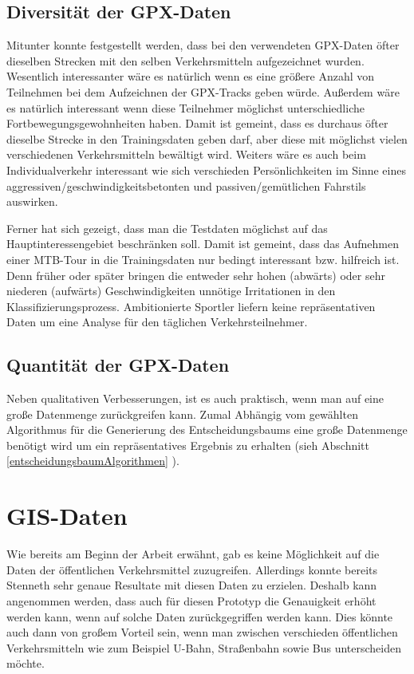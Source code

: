 \subsection{Diversität der GPX-Daten}
Mitunter konnte festgestellt werden, dass bei den verwendeten GPX-Daten öfter dieselben Strecken mit den selben Verkehrsmitteln aufgezeichnet wurden. Wesentlich interessanter wäre es natürlich wenn es eine größere Anzahl von Teilnehmen bei dem Aufzeichnen der GPX-Tracks geben würde. Außerdem wäre es natürlich interessant wenn diese Teilnehmer möglichst unterschiedliche Fortbewegungsgewohnheiten haben. Damit ist gemeint, dass es durchaus öfter dieselbe Strecke in den Trainingsdaten geben darf, aber diese mit möglichst vielen verschiedenen Verkehrsmitteln bewältigt wird. Weiters wäre es auch beim Individualverkehr interessant wie sich verschieden Persönlichkeiten im Sinne eines aggressiven/geschwindigkeitsbetonten und passiven/gemütlichen Fahrstils auswirken. 

Ferner hat sich gezeigt, dass man die Testdaten möglichst auf das Hauptinteressengebiet beschränken soll. Damit ist gemeint, dass das Aufnehmen einer MTB-Tour in die Trainingsdaten nur bedingt interessant bzw. hilfreich ist. Denn früher oder später bringen die entweder sehr hohen (abwärts) oder sehr niederen (aufwärts) Geschwindigkeiten unnötige Irritationen in den Klassifizierungsprozess. Ambitionierte Sportler liefern keine repräsentativen Daten um eine Analyse für den täglichen Verkehrsteilnehmer. 

\subsection{Quantität der GPX-Daten}
Neben qualitativen Verbesserungen, ist es auch praktisch, wenn man auf eine große Datenmenge zurückgreifen kann. Zumal Abhängig vom gewählten Algorithmus für die Generierung des Entscheidungsbaums eine große Datenmenge benötigt wird um ein repräsentatives Ergebnis zu erhalten (sieh Abschnitt \ref{entscheidungsbaumAlgorithmen} ).

\section{GIS-Daten}
Wie bereits am Beginn der Arbeit erwähnt, gab es keine Möglichkeit auf die Daten der öffentlichen Verkehrsmittel zuzugreifen. Allerdings konnte bereits Stenneth \cite{stenneth_transportation_2011} sehr genaue Resultate mit diesen Daten zu erzielen. Deshalb kann angenommen werden, dass auch für diesen Prototyp die Genauigkeit erhöht werden kann, wenn auf solche Daten zurückgegriffen werden kann. Dies könnte auch dann von großem Vorteil sein, wenn man zwischen verschieden öffentlichen Verkehrsmitteln wie zum Beispiel U-Bahn, Straßenbahn sowie Bus unterscheiden möchte. 

